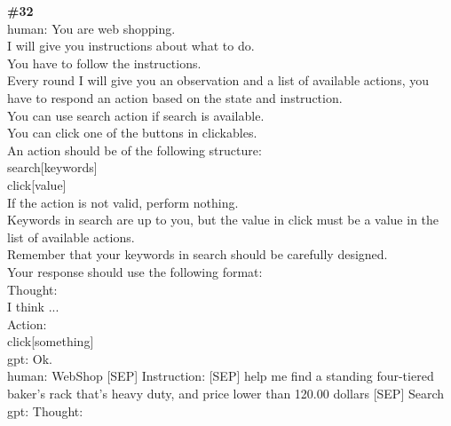 \documentclass[10pt]{article}
\begin{document}
\begin{Form}
\begin{tcolorbox}[colback=convbg,colframe=itemframe,boxrule=0.8pt,arc=2pt,breakable,left=6pt,right=6pt,top=5pt,bottom=5pt]
\end{tcolorbox}
\vspace{-1pt}
\CheckBox[name=q31c,width=1.6ex,height=1.6ex,bordercolor={0.45 0.45 0.45}]{~\textcolor{cbox}{COMPACT}}\quad
\CheckBox[name=q31d,width=1.6ex,height=1.6ex,bordercolor={0.45 0.45 0.45}]{~\textcolor{dbox}{DIFFUSE}}\quad
\CheckBox[name=q31n,width=1.6ex,height=1.6ex,bordercolor={0.45 0.45 0.45}]{~\textcolor{nbox}{NONE}}
\vspace{8pt}
\begin{tcolorbox}[colback=convbg,colframe=itemframe,boxrule=0.8pt,arc=2pt,breakable,left=6pt,right=6pt,top=5pt,bottom=5pt]
{\footnotesize\textbf{\#32}}\\[3pt]
{\footnotesize human: You are web shopping. \\[2pt]
I will give you instructions about what to do. \\[2pt]
You have to follow the instructions. \\[2pt]
Every round I will give you an observation and a list of available actions, you have to respond an action based on the state and instruction. \\[2pt]
You can use search action if search is available. \\[2pt]
You can click one of the buttons in clickables. \\[2pt]
An action should be of the following structure: \\[2pt]
search[keywords] \\[2pt]
click[value] \\[2pt]
If the action is not valid, perform nothing. \\[2pt]
Keywords in search are up to you, but the value in click must be a value in the list of available actions. \\[2pt]
Remember that your keywords in search should be carefully designed. \\[2pt]
Your response should use the following format: \\[2pt]
Thought: \\[2pt]
I think ... \\[2pt]
Action: \\[2pt]
click[something] \\[2pt]
gpt: Ok. \\[2pt]
human: WebShop [SEP] Instruction: [SEP] help me find a standing four-tiered baker's rack that's heavy duty, and price lower than 120.00 dollars [SEP] Search \\[2pt]
gpt: Thought: \\[2pt]
}
\end{tcolorbox}
\end{Form}
\end{document}
